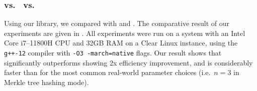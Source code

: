 \subsubsection*{\Arion{} vs.\  \Griffin{} vs.\  \Poseidon{}}
\begin{table}
  \centering
  \caption{Performance of various hash functions for generating a proof of membership in a Merkle 
      tree accumulator over BN254. Proving times are in milliseconds.}\label{tab:runtimes}
\end{table}

Using our library, we compared \Arion{} with \Griffin{} and \Poseidon{}.
The comparative result of our experiments are given in . 
All experiments were run on a system with an Intel Core i7--11800H CPU and 32GB RAM on a Clear Linux 
instance, using the \texttt{g++-12} compiler with \texttt{-O3 -march=native} flags.
Our result shows that \Arionhash{} significantly outperforms \Poseidon{} showing \(2\)x efficiency 
improvement, and \Aarionhash{} is considerably faster than \Griffin{} for the most common
real-world parameter choices (i.e.\ \(n = 3\) in Merkle tree hashing mode).
